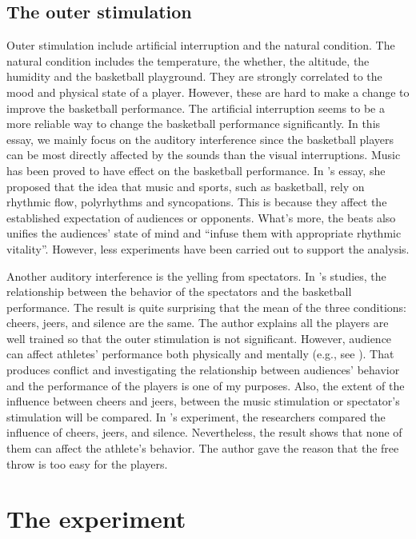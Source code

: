 \documentclass[man,floatsintext]{apa7}
\begin{document}
\subsection{The outer stimulation}
Outer stimulation include artificial interruption and the natural condition. The natural condition includes the temperature, the whether, the altitude, the humidity and the basketball playground. They are strongly correlated to the mood and physical state of a player. However, these are hard to make a change to improve the basketball performance. The artificial interruption seems to be a more reliable way to change the basketball performance significantly. In this essay, we mainly focus on the auditory interference since the basketball players can be most directly affected by the sounds than the visual interruptions. Music has been proved to have effect on the basketball performance. In \textcite{mcleodConstructionMasculinityAfrican2009}'s essay, she proposed that the idea that music and sports, such as basketball, rely on rhythmic flow, polyrhythms and syncopations. This is because they affect the established expectation of audiences or opponents. What's more, the beats also unifies the audiences' state of mind and ``infuse them with appropriate rhythmic vitality''. However, less experiments have been carried out to support the analysis. 

Another auditory interference is the yelling from spectators. In \textcite{eptingCheersVsJeers2011}'s studies, the relationship between the behavior of the spectators and the basketball performance. The result is quite surprising that the mean of the three conditions: cheers, jeers, and silence are the same. The author explains all the players are well trained so that the outer stimulation is not significant. However, audience can affect athletes' performance both physically and mentally (e.g., see \textcite{jonesAllWorldStage2007}). That produces conflict and investigating the relationship between audiences' behavior and the performance of the players is one of my purposes. Also, the extent of the influence between cheers and jeers, between the music stimulation or spectator's stimulation will be compared. In \textcite{eptingCheersVsJeers2011}'s experiment,  the researchers compared the influence of cheers, jeers, and silence. Nevertheless, the result shows that none of them can affect the athlete's behavior. The author gave the reason that the free throw is too easy for the players.

\section{The experiment}
\end{document}

